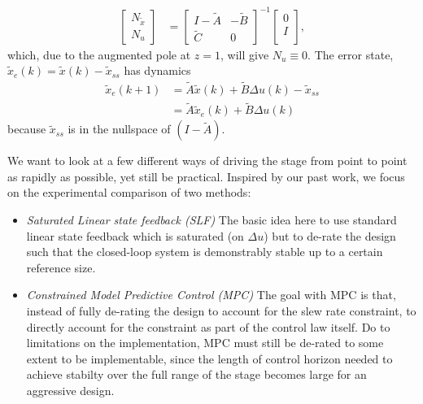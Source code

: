 \documentclass[journal,twocolumn,twoside]{IEEEtran}
\newcommand{\Ad}{\ensuremath{\tilde A }\xspace}
\newcommand{\Bd}{\ensuremath{\tilde B }\xspace}
\newcommand{\Cd}{\ensuremath{\tilde C }\xspace}
\newcommand{\xd}{\ensuremath{\tilde x }\xspace}
\newcommand{\xdss}{\ensuremath{\tilde x_{ss} }\xspace}
\newcommand{\xde}{\ensuremath{\tilde x_{e} }\xspace}
\newcommand{\dd}{\ensuremath{\Delta }\xspace}
\begin{document}
\begin{align}
  \begin{bmatrix}N_{\xd} \\ N_u\end{bmatrix} &=
\begin{bmatrix}I-\Ad & -\Bd\\\Cd & 0\end{bmatrix}^{-1}\begin{bmatrix}0\\ I\\\end{bmatrix}\label{eqn:nxnu},
\end{align}
which, due to the augmented pole at $z=1$, will give \(N_u\equiv 0\). 
The error state, \({\xde(k)=\xd(k) - \xdss}\) has dynamics
\begin{align}
  \xde(k+1) & = \Ad\xd(k) + \Bd\dd u(k) - \xdss \nonumber\\
            & = \Ad \xde(k)   + \Bd \dd u(k)\nonumber
\end{align}
because $\xdss$ is in the nullspace of $(I - \Ad)$.

We want to look at a few different ways of driving the stage from point to point as rapidly as possible, yet still be practical. Inspired by our past work, we focus on the experimental comparison of two methods:
\begin{itemize}
\item\emph{Saturated Linear state feedback (SLF)} The basic idea here to use standard linear state feedback which is saturated (on $\Delta u$) but to de-rate the design such that the closed-loop system is demonstrably stable up to a certain reference size. 
\item\emph{Constrained Model Predictive Control (MPC)} The goal with MPC is that, instead of fully de-rating the design to account for the slew rate constraint, to directly account for the constraint as part of the control law itself. Do to limitations on the implementation, MPC must still be de-rated to some extent to be implementable, since the length of control horizon needed to achieve stabilty over the full range of the stage becomes large for an aggressive design.
\end{itemize}
\end{document}
